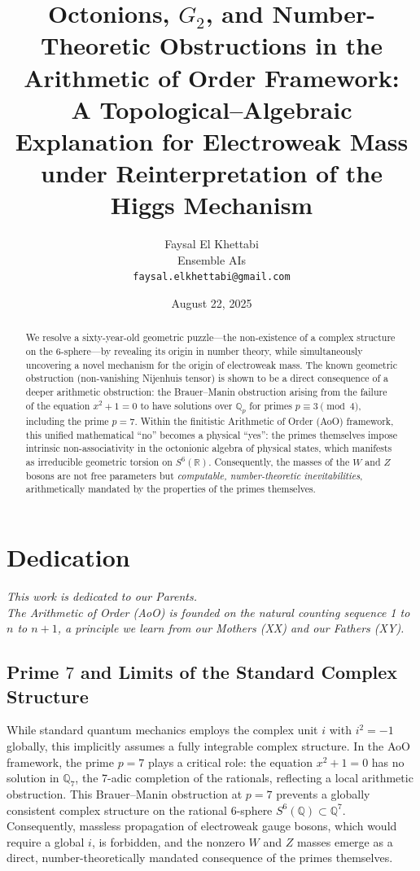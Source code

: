 \documentclass[12pt]{article}
\title{Octonions, \(G_2\), and Number-Theoretic Obstructions in the Arithmetic of Order Framework: \\ 
A Topological–Algebraic Explanation for Electroweak Mass under Reinterpretation of the Higgs Mechanism}
\author{Faysal El Khettabi \\ 
Ensemble AIs \\ 
\texttt{faysal.elkhettabi@gmail.com}}
\date{August 22, 2025}
\begin{document}
\maketitle

\section*{Dedication} 
\begin{center}
\textit{This work is dedicated to our Parents. \\ 
The Arithmetic of Order (AoO) is founded on the natural counting sequence 1 to \(n\) to \(n+1\), a principle we learn from our Mothers (XX) and our Fathers (XY).}
\end{center}

\begin{abstract}
We resolve a sixty-year-old geometric puzzle—the non-existence of a complex structure on the 6-sphere—by revealing its origin in number theory, while simultaneously uncovering a novel mechanism for the origin of electroweak mass. The known geometric obstruction (non-vanishing Nijenhuis tensor) is shown to be a direct consequence of a deeper arithmetic obstruction: the Brauer–Manin obstruction arising from the failure of the equation \(x^2+1=0\) to have solutions over \(\mathbb{Q}_p\) for primes \(p \equiv 3 \pmod{4}\), including the prime \(p=7\). Within the finitistic Arithmetic of Order (AoO) framework, this unified mathematical “no” becomes a physical “yes”: the primes themselves impose intrinsic non-associativity in the octonionic algebra of physical states, which manifests as irreducible geometric torsion on \(S^6(\mathbb{R})\). Consequently, the masses of the \(W\) and \(Z\) bosons are not free parameters but \emph{computable, number-theoretic inevitabilities}, arithmetically mandated by the properties of the primes themselves.
\end{abstract}

\subsection*{Prime \(7\) and Limits of the Standard Complex Structure}

While standard quantum mechanics employs the complex unit \(i\) with \(i^2=-1\) globally, this implicitly assumes a fully integrable complex structure. In the AoO framework, the prime \(p=7\) plays a critical role: the equation \(x^2+1=0\) has no solution in \(\mathbb{Q}_7\), the 7-adic completion of the rationals, reflecting a local arithmetic obstruction. This Brauer–Manin obstruction at \(p=7\) prevents a globally consistent complex structure on the rational 6-sphere \(S^6(\mathbb{Q})\subset \mathbb{Q}^7\). Consequently, massless propagation of electroweak gauge bosons, which would require a global \(i\), is forbidden, and the nonzero \(W\) and \(Z\) masses emerge as a direct, number-theoretically mandated consequence of the primes themselves.
\end{document}
